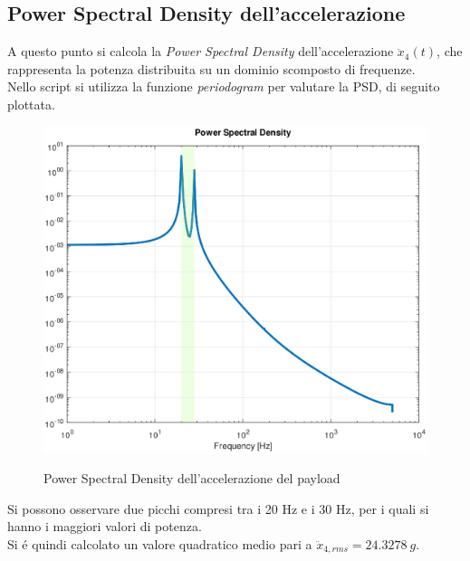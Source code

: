 \documentclass{article}
\begin{document}
        \clearpage
        
        \subsection{Power Spectral Density dell'accelerazione\label{Esercitazione_2_PSD}}

        A questo punto si calcola la \textit{Power Spectral Density} dell'accelerazione $\ddot{x}_4 (t)$, che rappresenta la potenza 
        distribuita su un dominio scomposto di frequenze. \\ 

        Nello script si utilizza la funzione \textit{periodogram} per valutare la PSD, di seguito plottata.

            \begin{figure}[h!]
                 \label{fig:PSD}
                \includegraphics[width=\textwidth]{MUL2/Esercitazione2/Matlab/PSD.eps}
                \caption{Power Spectral Density dell'accelerazione del payload}
            \end{figure}

        Si possono osservare due picchi compresi tra i 20 Hz e i 30 Hz, per i quali si hanno i maggiori valori di potenza. \\ 

        Si é quindi calcolato un valore quadratico medio pari a $\ddot{x}_{4,rms} = 24.3278 \ g$.

        \clearpage
\end{document}
